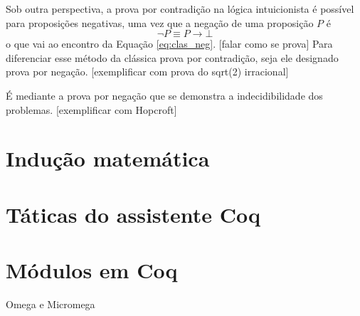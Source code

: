 Sob outra perspectiva, a prova por contradição na lógica intuicionista é possível para proposições negativas, uma vez que a negação de uma proposição $P$ é $$\neg P \equiv P \to \bot$$ o que vai ao encontro da Equação \ref{eq:clas_neg}. [falar como se prova] Para diferenciar esse método da clássica prova por contradição, seja ele designado prova por negação. [exemplificar com prova do sqrt(2) irracional]

É mediante a prova por negação que se demonstra a indecidibilidade dos problemas. [exemplificar com Hopcroft]

\section{Indução matemática}

\section{Táticas do assistente Coq}

\section{Módulos em Coq}

Omega e Micromega \cite{manual}
